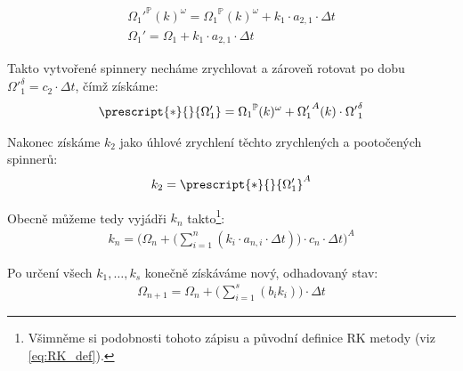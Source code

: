 \begin{equation}
    \label{eq:sim_equations_formalized8}
    \begin{gathered}
        {\Omega_1'}^{\mathbb{P}} (k) ^{\omega} = {\Omega_1}^{\mathbb{P}} (k) ^{\omega} + k_1 \cdot a_{2, 1} \cdot \Delta t \\
        {\Omega_1'} = {\Omega_1} + k_1 \cdot a_{2, 1} \cdot \Delta t
    \end{gathered}
\end{equation}

\clearpage

Takto vytvořené spinnery necháme zrychlovat a zároveň rotovat po dobu ${\Omega'}_1^\delta = c_2 \cdot \Delta t$, čímž získáme:
\begin{equation}
    \label{eq:sim_equations_formalized9}
    \begin{gathered}
        \prescript{*}{}{\Omega_1'} = {\Omega_1}^{\mathbb{P}} (k) ^{\omega} + {\Omega_1'}^{A} (k) \cdot {\Omega'}_1^\delta
    \end{gathered}
\end{equation}

Nakonec získáme $k_2$ jako úhlové zrychlení těchto zrychlených a pootočených spinnerů:
\begin{equation}
    \label{eq:sim_equations_formalized10}
    \begin{gathered}
        k_2 = \prescript{*}{}{\Omega_1'}^{A}
    \end{gathered}
\end{equation}

Obecně můžeme tedy vyjádři $k_{n}$ takto\footnote{Všimněme si podobnosti tohoto zápisu a původní definice RK metody (viz \autoref{eq:RK_def}).}:
\begin{equation}
    \label{eq:sim_equations_formalized11}
    \begin{gathered}
        k_{n} = \Bigg( {\Omega_n} + \Bigg( \sum_{i=1}^{n} ( k_i \cdot a_{n, i} \cdot \Delta t) \Bigg) \cdot c_{n} \cdot \Delta t \Bigg)^A
    \end{gathered}
\end{equation}

Po určení všech $k_1, \ldots, k_s$ konečně získáváme nový, odhadovaný stav:
\begin{equation}
    \label{eq:sim_equations_formalized12}
    \begin{gathered}
        {\Omega_{n+1}} = \Omega_{n} + \Bigg(\sum_{i=1}^{s} ( b_i k_i)\Bigg) \cdot \Delta t
    \end{gathered}
\end{equation}


